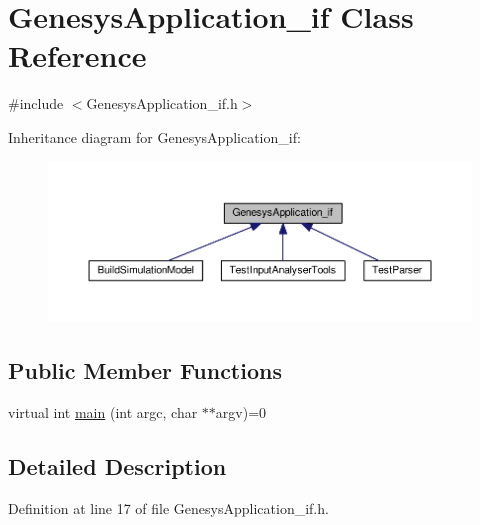 \hypertarget{class_genesys_application__if}{\section{Genesys\-Application\-\_\-if Class Reference}
\label{class_genesys_application__if}
}


{\ttfamily \#include $<$Genesys\-Application\-\_\-if.\-h$>$}



Inheritance diagram for Genesys\-Application\-\_\-if\-:\nopagebreak
\begin{figure}[H]
\begin{center}
\leavevmode
\includegraphics[width=350pt]{class_genesys_application__if__inherit__graph}
\end{center}
\end{figure}
\subsection*{Public Member Functions}
\begin{DoxyCompactItemize}
\item 
virtual int \hyperlink{class_genesys_application__if_a2b07e7803b410a4a8d0f87422dabb004}{main} (int argc, char $\ast$$\ast$argv)=0
\end{DoxyCompactItemize}


\subsection{Detailed Description}


Definition at line 17 of file Genesys\-Application\-\_\-if.\-h.



